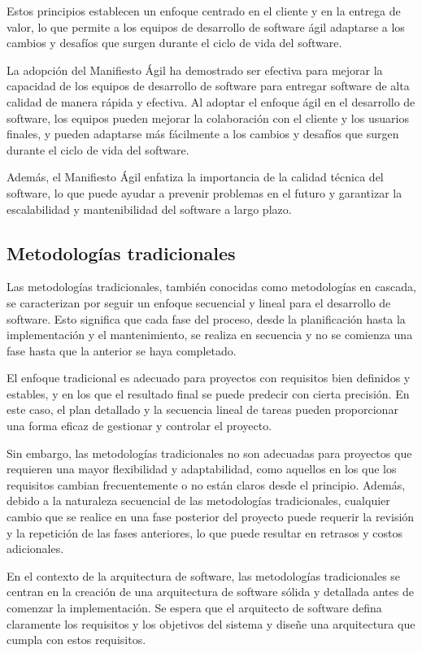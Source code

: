 \documentclass[executivepaper]{article}
\begin{document}
Estos principios establecen un enfoque centrado en el cliente y en la entrega de valor, lo que permite a los equipos de desarrollo de software ágil adaptarse a los cambios y desafíos que surgen durante el ciclo de vida del software.

La adopción del Manifiesto Ágil ha demostrado ser efectiva para mejorar la capacidad de los equipos de desarrollo de software para entregar software de alta calidad de manera rápida y efectiva. Al adoptar el enfoque ágil en el desarrollo de software, los equipos pueden mejorar la colaboración con el cliente y los usuarios finales, y pueden adaptarse más fácilmente a los cambios y desafíos que surgen durante el ciclo de vida del software.

Además, el Manifiesto Ágil enfatiza la importancia de la calidad técnica del software, lo que puede ayudar a prevenir problemas en el futuro y garantizar la escalabilidad y mantenibilidad del software a largo plazo.

\subsection{Metodologías tradicionales}
Las metodologías tradicionales, también conocidas como metodologías en cascada, se caracterizan por seguir un enfoque secuencial y lineal para el desarrollo de software. Esto significa que cada fase del proceso, desde la planificación hasta la implementación y el mantenimiento, se realiza en secuencia y no se comienza una fase hasta que la anterior se haya completado.

El enfoque tradicional es adecuado para proyectos con requisitos bien definidos y estables, y en los que el resultado final se puede predecir con cierta precisión. En este caso, el plan detallado y la secuencia lineal de tareas pueden proporcionar una forma eficaz de gestionar y controlar el proyecto.

Sin embargo, las metodologías tradicionales no son adecuadas para proyectos que requieren una mayor flexibilidad y adaptabilidad, como aquellos en los que los requisitos cambian frecuentemente o no están claros desde el principio. Además, debido a la naturaleza secuencial de las metodologías tradicionales, cualquier cambio que se realice en una fase posterior del proyecto puede requerir la revisión y la repetición de las fases anteriores, lo que puede resultar en retrasos y costos adicionales.

En el contexto de la arquitectura de software, las metodologías tradicionales se centran en la creación de una arquitectura de software sólida y detallada antes de comenzar la implementación. Se espera que el arquitecto de software defina claramente los requisitos y los objetivos del sistema y diseñe una arquitectura que cumpla con estos requisitos.
\end{document}
